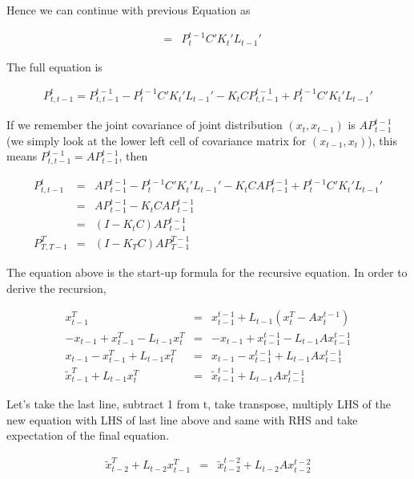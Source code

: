 \documentclass[12pt]{report}
\begin{document}
Hence we can continue with previous Equation as

\begin{eqnarray*}
  &=& P_{t}^{t-1} C' K_t'L_{t-1}'
\end{eqnarray*}

The full equation is

\begin{eqnarray*}
P_{t,t-1}^t = P_{t,t-1}^{t-1} - P_t^{t-1}C'K_t'L_{t-1}' - K_tCP_{t,t-1}^{t-1} + P_{t}^{t-1} C' K_t'L_{t-1}'
\end{eqnarray*}

If we remember the joint covariance of joint distribution $(x_{t},x_{t-1})$ is
$AP_{t-1}^{t-1}$ (we simply look at the lower left cell of covariance matrix for
$(x_{t-1},x_{t})$), this means $P_{t,t-1}^{t-1} = AP_{t-1}^{t-1}$, then

\begin{eqnarray*}
  P_{t,t-1}^t &=& AP_{t-1}^{t-1} - P_t^{t-1}C'K_t'L_{t-1}' - K_t C AP_{t-1}^{t-1} + P_{t}^{t-1} C' K_t'L_{t-1}'\\
  &=& AP_{t-1}^{t-1}  - K_t C AP_{t-1}^{t-1} \\
  &=& (I  - K_t C)AP_{t-1}^{t-1}\\
  P_{T,T-1}^T &=& (I  - K_T C)AP_{T-1}^{T-1}
\end{eqnarray*}

The equation above is the start-up formula for the recursive equation. In order
to derive the recursion,

\begin{eqnarray*}
x_{t-1}^T &=& x_{t-1}^{t-1} + L_{t-1}(x_t^T - Ax_t^{t-1}) \\
-x_{t-1} + x_{t-1}^T - L_{t-1}x_t^T &=& -x_{t-1} + x_{t-1}^{t-1} - L_{t-1}Ax_{t-1}^{t-1}\\
x_{t-1} - x_{t-1}^T + L_{t-1}x_t^T &=& x_{t-1} - x_{t-1}^{t-1} + L_{t-1}Ax_{t-1}^{t-1}\\
\tilde{x}_{t-1}^T + L_{t-1}x_t^T &=& \tilde{x}_{t-1}^{t-1} + L_{t-1}Ax_{t-1}^{t-1}
\end{eqnarray*}

Let's take the last line, subtract 1 from t, take transpose, multiply LHS of the
new equation with LHS of last line above and same with RHS and take expectation
of the final equation.

\begin{eqnarray*}
\tilde{x}_{t-2}^T + L_{t-2}x_{t-1}^T &=& \tilde{x}_{t-2}^{t-2} + L_{t-2}Ax_{t-2}^{t-2}
\end{eqnarray*}
\end{document}
